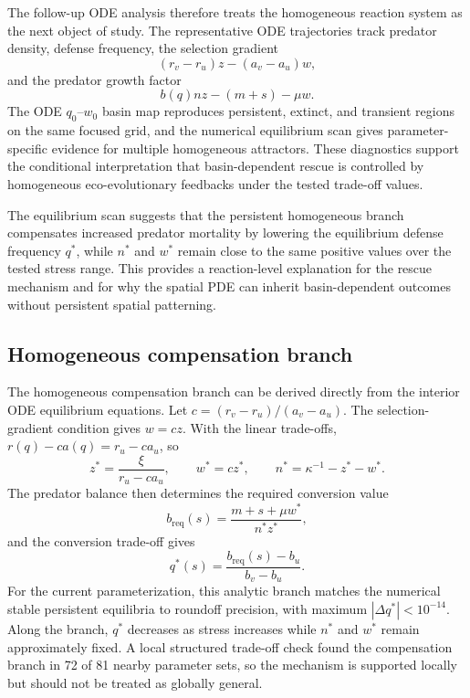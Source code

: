 \documentclass[11pt]{article}
\begin{document}
The follow-up ODE analysis therefore treats the homogeneous reaction system as the next object of study. The representative ODE trajectories track predator density, defense frequency, the selection gradient
\[
(r_v-r_u)z-(a_v-a_u)w,
\]
and the predator growth factor
\[
b(q)nz-(m+s)-\mu w.
\]
The ODE \(q_0\)--\(w_0\) basin map reproduces persistent, extinct, and transient regions on the same focused grid, and the numerical equilibrium scan gives parameter-specific evidence for multiple homogeneous attractors. These diagnostics support the conditional interpretation that basin-dependent rescue is controlled by homogeneous eco-evolutionary feedbacks under the tested trade-off values.

The equilibrium scan suggests that the persistent homogeneous branch compensates increased predator mortality by lowering the equilibrium defense frequency \(q^*\), while \(n^*\) and \(w^*\) remain close to the same positive values over the tested stress range. This provides a reaction-level explanation for the rescue mechanism and for why the spatial PDE can inherit basin-dependent outcomes without persistent spatial patterning.

\subsection{Homogeneous compensation branch}

The homogeneous compensation branch can be derived directly from the interior ODE equilibrium equations. Let \(c=(r_v-r_u)/(a_v-a_u)\). The selection-gradient condition gives \(w=cz\). With the linear trade-offs, \(r(q)-ca(q)=r_u-ca_u\), so
\[
z^*=\frac{\xi}{r_u-ca_u},\qquad
w^*=cz^*,\qquad
n^*=\kappa^{-1}-z^*-w^*.
\]
The predator balance then determines the required conversion value
\[
b_{\mathrm{req}}(s)=\frac{m+s+\mu w^*}{n^*z^*},
\]
and the conversion trade-off gives
\[
q^*(s)=\frac{b_{\mathrm{req}}(s)-b_u}{b_v-b_u}.
\]
For the current parameterization, this analytic branch matches the numerical stable persistent equilibria to roundoff precision, with maximum \(|\Delta q^*|<10^{-14}\). Along the branch, \(q^*\) decreases as stress increases while \(n^*\) and \(w^*\) remain approximately fixed. A local structured trade-off check found the compensation branch in 72 of 81 nearby parameter sets, so the mechanism is supported locally but should not be treated as globally general.
\end{document}

